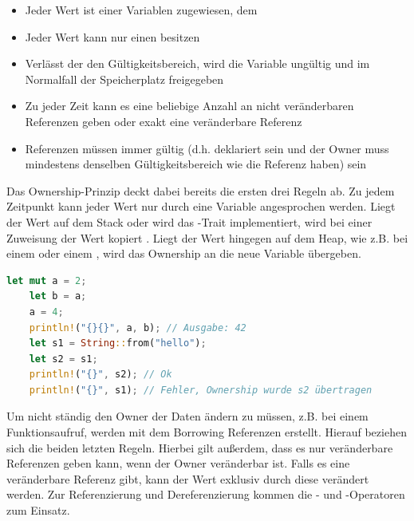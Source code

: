 \documentclass[11pt,a4paper, ngerman]{article}
\begin{document}
\begin{itemize}
    \item Jeder Wert ist einer Variablen zugewiesen, dem 
    \item Jeder Wert kann nur einen  besitzen
    \item Verlässt der  den Gültigkeitsbereich, wird die Variable ungültig und im Normalfall der Speicherplatz freigegeben
    \item Zu jeder Zeit kann es eine beliebige Anzahl an nicht veränderbaren Referenzen geben oder exakt eine veränderbare Referenz
    \item Referenzen müssen immer gültig (d.h. deklariert sein und der Owner muss mindestens denselben Gültigkeitsbereich wie die Referenz haben) sein
\end{itemize}

\label{sec:Ownership}
Das Ownership-Prinzip deckt dabei bereits die ersten drei Regeln ab. Zu jedem Zeitpunkt kann jeder Wert nur durch eine Variable angesprochen werden. Liegt der Wert auf dem Stack oder wird das -Trait implementiert, wird bei einer Zuweisung der Wert kopiert \cite{CopyTraitOwner}. Liegt der Wert hingegen auf dem Heap, wie z.B. bei einem  oder einem , wird das Ownership an die neue Variable übergeben.

\begin{lstlisting}[language=rust, caption={ownership}]
    let mut a = 2;
    let b = a;
    a = 4;
    println!("{}{}", a, b); // Ausgabe: 42
    let s1 = String::from("hello");
    let s2 = s1;
    println!("{}", s2); // Ok
    println!("{}", s1); // Fehler, Ownership wurde s2 übertragen
\end{lstlisting}

Um nicht ständig den Owner der Daten ändern zu müssen, z.B. bei einem Funktionsaufruf, werden mit dem Borrowing Referenzen erstellt. Hierauf beziehen sich die beiden letzten Regeln. Hierbei gilt außerdem, dass es nur veränderbare Referenzen geben kann, wenn der Owner veränderbar ist. Falls es eine veränderbare Referenz gibt, kann der Wert exklusiv durch diese verändert werden. Zur Referenzierung und Dereferenzierung kommen die \codeword{&}- und \codeword{*}-Operatoren zum Einsatz.
\end{document}
